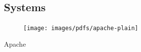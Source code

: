 \begin{aside}
    \subsection{Systems}
      \hspace{-0.5mm}%
      \begin{center}
        \vspace{0.4mm}%
        \begin{minipage}[t]{8mm}
          \vspace{-4mm}
          \begin{center}
            \begin{figure}
              \texttt{[image: images/pdfs/apache-plain]}
            \end{figure}
            \vspace{1.8mm}
            \small{Apache}
          \end{center}
        \end{minipage}%
        \hspace{2.8mm}%
        \hspace{0mm}%
      \end{center}


\end{aside}
